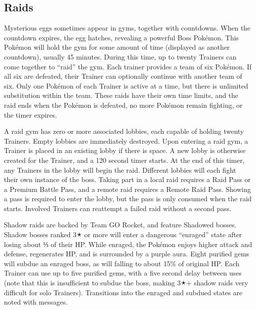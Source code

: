 \subsection{Raids}
\label{sec:raids}
Mysterious eggs sometimes appear in gyms, together with countdowns.
When the countdown expires, the egg hatches, revealing a powerful Boss Pokémon.
This Pokémon will hold the gym for some amount of time (displayed as another countdown), usually 45 minutes.
During this time, up to twenty Trainers can come together to ``raid'' the gym.
Each trainer provides a team of six Pokémon.
If all six are defeated, their Trainer can optionally continue with another team of six.
Only one Pokémon of each Trainer is active at a time, but there is unlimited substitution within the team.
These raids have their own time limits, and the raid ends when the Pokémon is defeated, no more Pokémon remain fighting,
  or the timer expires.

A raid gym has zero or more associated lobbies, each capable of holding twenty Trainers.
Empty lobbies are immediately destroyed.
Upon entering a raid gym, a Trainer is placed in an existing lobby if there is space.
A new lobby is otherwise created for the Trainer, and a 120 second timer starts.
At the end of this timer, any Trainers in the lobby will begin the raid.
Different lobbies will each fight their own instance of the boss.
Taking part in a local raid requires a Raid Pass or a Premium Battle Pass,
  and a remote raid requires a Remote Raid Pass.
Showing a pass is required to enter the lobby, but the pass is only consumed when the raid starts.
Involved Trainers can reattempt a failed raid without a second pass.

Shadow raids are backed by Team GO Rocket, and feature Shadowed bosses.
Shadow bosses ranked 3🟉 or more will enter a dangerous ``enraged'' state after losing about ⅓ of their HP.
While enraged, the Pokémon enjoys higher attack and defense, regenerates HP, and is surrounded by a purple aura.
Eight purified gems will subdue an enraged boss, as will falling to about 15\% of original HP.
Each Trainer can use up to five purified gems, with a five second delay between uses
 (note that this is insufficient to subdue the boss, making 3🟉+ shadow raids
 very difficult for solo Trainers).
Transitions into the enraged and subdued states are noted with messages.

